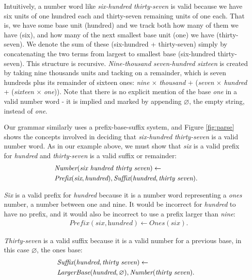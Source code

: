 \documentclass[10pt,letterpaper]{article}
\begin{document}
Intuitively, a number word like \emph{six-hundred thirty-seven} is
valid because we have six units of one hundred each and thirty-seven
remaining units of one each. That is, we have some base unit (hundred)
and we track both how many of them we have (six), and how many of the
next smallest base unit (one) we have (thirty-seven). We denote the
sum of these (six-hundred + thirty-seven) simply by concatenating the
two terms from largest to smallest base (six-hundred thirty-seven).
This structure is recursive. \emph{Nine-thousand seven-hundred
  sixteen} is created by taking nine thousands units and tacking on a
remainder, which is seven hundreds plus its remainder of sixteen ones:
\emph{nine} $\times$ \emph{thousand} $+$ (\emph{seven} $\times$
\emph{hundred} + (\emph{sixteen} $\times$ \emph{one})). Note that
there is no explicit mention of the base \emph{one} in a valid number
word - it is implied and marked by appending $\varnothing$, the empty
string, instead of \emph{one}.

Our grammar similarly uses a prefix-base-suffix system, and Figure
\ref{fig:parse} shows the concepts involved in deciding that
\emph{six-hundred thirty-seven} is a valid number word. As in our
example above, we must show that \emph{six} is a valid prefix for
\emph{hundred} and \emph{thirty-seven} is a valid suffix or remainder:
\setlength{\jot}{0pt}
\begin{align}
  & \textit{Number}(\textit{six hundred thirty seven}) \leftarrow\\
  & \textit{Prefix}(\textit{six}, \textit{hundred}), \textit{Suffix}(\textit{hundred}, \textit{thirty seven}).\notag
\end{align}

\noindent\emph{Six} is a valid prefix for \emph{hundred} because it is
a number word representing a \emph{ones} number, a number between one
and nine. It would be incorrect for \emph{hundred} to have no prefix,
and it would also be incorrect to use a prefix larger than
\emph{nine}:
\begin{align}
  & \textit{Prefix}(\textit{six}, \textit{hundred}) \leftarrow \textit{Ones}(\textit{six}).
\end{align}

\noindent\emph{Thirty-seven} is a valid suffix because it is a valid
number for a previous base, in this case $\varnothing$, the ones base:
\begin{align}
  & \textit{Suffix}(\textit{hundred}, \textit{thirty seven}) \leftarrow\\
  & \textit{LargerBase}(\textit{hundred}, \varnothing), \textit{Number}(\textit{thirty seven}).\notag
\end{align}
\end{document}

